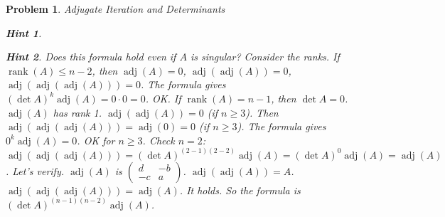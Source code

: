 \documentclass[12pt]{article}
\newtheorem{problem}{Problem}[section]
\theoremstyle{definition}
\newtheorem{hint}{Hint}[question]
\newcommand{\adj}{\operatorname{adj}}
\newcommand{\detm}{\operatorname{det}}
\newcommand{\rank}{\operatorname{rank}}
\begin{document}
\begin{problem}{Adjugate Iteration and Determinants}
\begin{hint}
    \end{hint}
    \begin{hint}
        Does this formula hold even if $A$ is singular? Consider the ranks. If $\rank(A) \le n-2$, then $\adj(A)=0$, $\adj(\adj(A))=0$, $\adj(\adj(\adj(A)))=0$. The formula gives $(\detm A)^k \adj(A) = 0 \cdot 0 = 0$. OK.
        If $\rank(A)=n-1$, then $\detm A = 0$. $\adj(A)$ has rank 1. $\adj(\adj(A))=0$ (if $n \ge 3$). Then $\adj(\adj(\adj(A))) = \adj(0) = 0$ (if $n \ge 3$). The formula gives $0^k \adj(A) = 0$. OK for $n \ge 3$.
        Check $n=2$: $\adj(\adj(\adj(A))) = (\detm A)^{(2-1)(2-2)} \adj(A) = (\detm A)^0 \adj(A) = \adj(A)$. Let's verify. $\adj(A)$ is $\begin{pmatrix} d & -b \\ -c & a \end{pmatrix}$. $\adj(\adj(A))=A$. $\adj(\adj(\adj(A))) = \adj(A)$. It holds.
        So the formula is $(\detm A)^{(n-1)(n-2)} \adj(A)$.
    \end{hint}
\end{problem}
\end{document}
